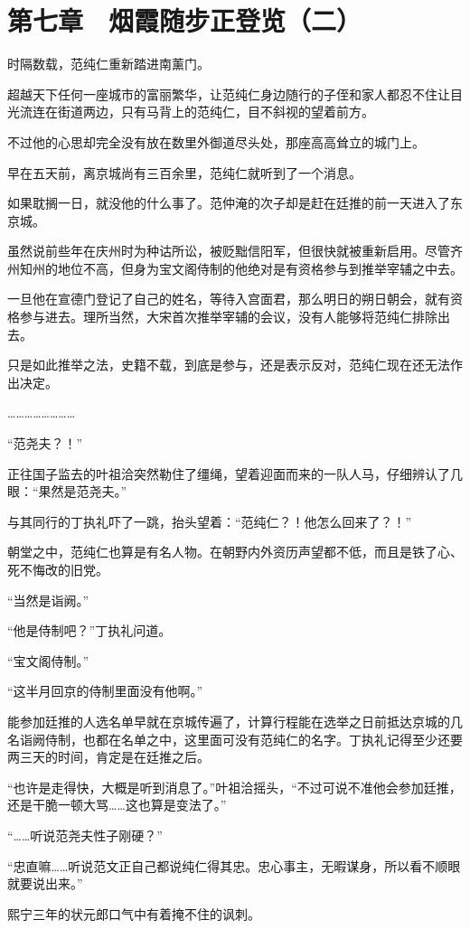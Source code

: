 \section{第七章　烟霞随步正登览（二）}

时隔数载，范纯仁重新踏进南薰门。

超越天下任何一座城市的富丽繁华，让范纯仁身边随行的子侄和家人都忍不住让目光流连在街道两边，只有马背上的范纯仁，目不斜视的望着前方。

不过他的心思却完全没有放在数里外御道尽头处，那座高高耸立的城门上。

早在五天前，离京城尚有三百余里，范纯仁就听到了一个消息。

如果耽搁一日，就没他的什么事了。范仲淹的次子却是赶在廷推的前一天进入了东京城。

虽然说前些年在庆州时为种诂所讼，被贬黜信阳军，但很快就被重新启用。尽管齐州知州的地位不高，但身为宝文阁侍制的他绝对是有资格参与到推举宰辅之中去。

一旦他在宣德门登记了自己的姓名，等待入宫面君，那么明日的朔日朝会，就有资格参与进去。理所当然，大宋首次推举宰辅的会议，没有人能够将范纯仁排除出去。

只是如此推举之法，史籍不载，到底是参与，还是表示反对，范纯仁现在还无法作出决定。

……………………

“范尧夫？！”

正往国子监去的叶祖洽突然勒住了缰绳，望着迎面而来的一队人马，仔细辨认了几眼：“果然是范尧夫。”

与其同行的丁执礼吓了一跳，抬头望着：“范纯仁？！他怎么回来了？！”

朝堂之中，范纯仁也算是有名人物。在朝野内外资历声望都不低，而且是铁了心、死不悔改的旧党。

“当然是诣阙。”

“他是侍制吧？”丁执礼问道。

“宝文阁侍制。”

“这半月回京的侍制里面没有他啊。”

能参加廷推的人选名单早就在京城传遍了，计算行程能在选举之日前抵达京城的几名诣阙侍制，也都在名单之中，这里面可没有范纯仁的名字。丁执礼记得至少还要两三天的时间，肯定是在廷推之后。

“也许是走得快，大概是听到消息了。”叶祖洽摇头，“不过可说不准他会参加廷推，还是干脆一顿大骂……这也算是变法了。”

“……听说范尧夫性子刚硬？”

“忠直嘛……听说范文正自己都说纯仁得其忠。忠心事主，无暇谋身，所以看不顺眼就要说出来。”

熙宁三年的状元郎口气中有着掩不住的讽刺。

